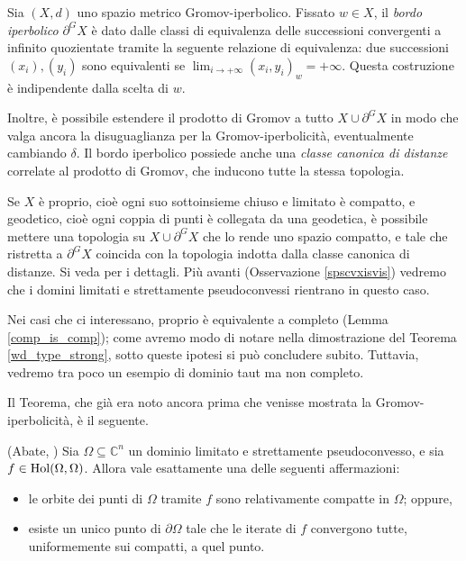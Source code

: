 \begin{defn}
    Sia $(X,d)$ uno spazio metrico Gromov-iperbolico. Fissato $w \in X$, il \textit{bordo iperbolico} $\partial^GX$ è dato dalle classi di equivalenza delle successioni convergenti a infinito quozientate tramite la seguente relazione di equivalenza: due successioni $(x_i), (y_i)$ sono equivalenti se $\displaystyle\lim_{i\rightarrow+\infty}(x_i,y_i)_w=+\infty$. Questa costruzione è indipendente dalla scelta di $w$.

    Inoltre, è possibile estendere il prodotto di Gromov a tutto $X\cup\partial^GX$ in modo che valga ancora la disuguaglianza per la Gromov-iperbolicità, eventualmente cambiando $\delta$. Il bordo iperbolico possiede anche una \textit{classe canonica di distanze} correlate al prodotto di Gromov, che inducono tutte la stessa topologia.
\end{defn}

\begin{oss}
    Se $X$ è proprio, cioè ogni suo sottoinsieme chiuso e limitato è compatto, e geodetico, cioè ogni coppia di punti è collegata da una geodetica, è possibile mettere una topologia su $X\cup\partial^GX$ che lo rende uno spazio compatto, e tale che ristretta a $\partial^GX$ coincida con la topologia indotta dalla classe canonica di distanze. Si veda \cite[Part III, Chapter H, Paragraph 3]{BH} per i dettagli. Più avanti (Osservazione \ref{spscvxisvis}) vedremo che i domini limitati e strettamente pseudoconvessi rientrano in questo caso.
\end{oss}

\begin{oss}
    Nei casi che ci interessano, proprio è equivalente a completo (Lemma \ref{comp_is_comp}); come avremo modo di notare nella dimostrazione del Teorema \ref{wd_type_strong}, sotto queste ipotesi si può concludere subito. Tuttavia, vedremo tra poco un esempio di dominio taut ma non completo.
\end{oss}

Il Teorema, che già era noto ancora prima che venisse mostrata la Gromov-iperbolicità, è il seguente.

\begin{thm} \label{abate_wd}
    (Abate, \cite[Theorem 0.5]{A4}) Sia $\Omega \subseteq \mathbb{C}^n$ un dominio limitato e strettamente pseudoconvesso, e sia $f \in \textnormal{Hol}(\Omega,\Omega)$. Allora vale esattamente una delle seguenti affermazioni:
    \begin{itemize}
        \item le orbite dei punti di $\Omega$ tramite $f$ sono relativamente compatte in $\Omega$; oppure,
        \item esiste un unico punto di $\partial\Omega$ tale che le iterate di $f$ convergono tutte, uniformemente sui compatti, a quel punto.
    \end{itemize}
\end{thm}

